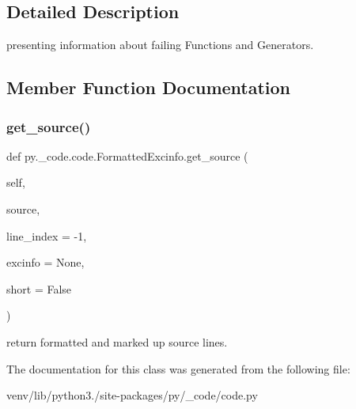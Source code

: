 \subsection{Detailed Description}
\begin{DoxyVerb}presenting information about failing Functions and Generators. \end{DoxyVerb}
 

\subsection{Member Function Documentation}
\mbox{\label{classpy_1_1__code_1_1code_1_1_formatted_excinfo_a4474c8457b036ee2451cead0712ca631}} 
\subsubsection{\texorpdfstring{get\+\_\+source()}{get\_source()}}
{\footnotesize\ttfamily def py.\+\_\+code.\+code.\+Formatted\+Excinfo.\+get\+\_\+source (\begin{DoxyParamCaption}\item[{}]{self,  }\item[{}]{source,  }\item[{}]{line\+\_\+index = {\ttfamily -\/1},  }\item[{}]{excinfo = {\ttfamily None},  }\item[{}]{short = {\ttfamily False} }\end{DoxyParamCaption})}

\begin{DoxyVerb}return formatted and marked up source lines. \end{DoxyVerb}
 

The documentation for this class was generated from the following file\+:\begin{DoxyCompactItemize}
\item 
venv/lib/python3./site-\/packages/py/\+\_\+code/code.\+py\end{DoxyCompactItemize}

